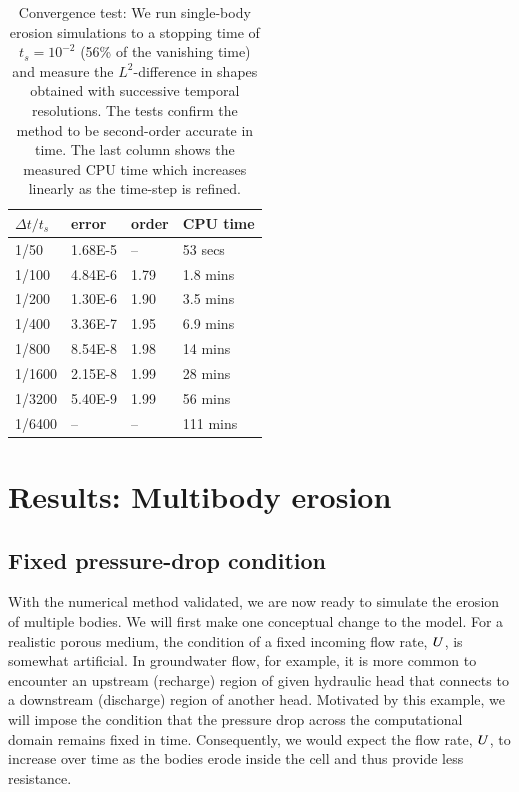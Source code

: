 \documentclass[preprint, 10pt]{elsarticle}
\begin{document}
\begin{table}%
\begin{center}
\caption{Convergence test: We run single-body erosion simulations to a stopping time of $t_s = 10^{-2}$ (56\% of the vanishing time) and measure the $L^2$-difference in shapes obtained with successive temporal resolutions. The tests confirm the method to be second-order accurate in time. The last column shows the measured CPU time which increases linearly as the time-step is refined.
}
\vspace{0.3 pc}
\label{convtab}
\begin{tabular}{l l l l}
\hline
\hspace{0.0pc} $\Delta t/t_s$
\hspace{0.5pc} & error 
\hspace{0.5pc} & order
\hspace{0.5pc} & CPU time \\
\hline
%
1/50		& 1.68E-5		& --		& 53 secs     	\\
1/100	& 4.84E-6		& 1.79	& 1.8 mins   	\\
1/200	& 1.30E-6		& 1.90	& 3.5 mins  	\\
1/400	& 3.36E-7		& 1.95	& 6.9 mins  	\\
1/800	& 8.54E-8		& 1.98	& 14 mins   	\\
1/1600	& 2.15E-8		& 1.99	& 28 mins  	\\
1/3200	& 5.40E-9		& 1.99	& 56 mins    	\\
1/6400	& --			& --		& 111 mins	\\
%
\hline
\end{tabular}
\end{center}
\end{table}



\section{Results: Multibody erosion}
\label{s:MultiResults}

\subsection{Fixed pressure-drop condition}

With the numerical method validated, we are now ready to simulate the erosion of multiple bodies. We will first make one conceptual change to the model. For a realistic porous medium, the condition of a fixed incoming flow rate, $U$, is somewhat artificial. In groundwater flow, for example, it is more common to encounter an upstream (recharge) region of given hydraulic head that connects to a downstream (discharge) region of another head. Motivated by this example, we will impose the condition that the pressure drop across the computational domain remains fixed in time. Consequently, we would expect the flow rate, $U$, to increase over time as the bodies erode inside the cell and thus provide less resistance.
\end{document}
